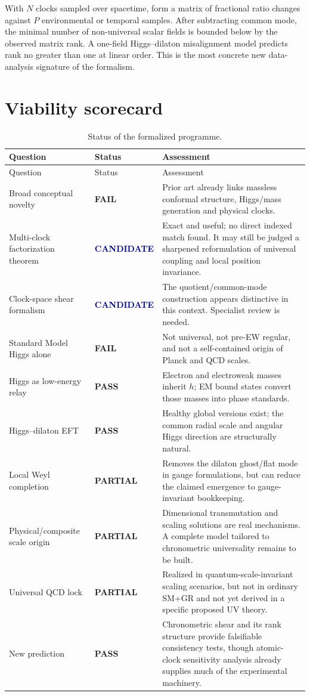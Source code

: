 \documentclass[11pt,a4paper]{article}
\newcommand{\Pass}{\textcolor{deepgreen}{\textbf{PASS}}}
\newcommand{\Fail}{\textcolor{deepred}{\textbf{FAIL}}}
\newcommand{\Partial}{\textcolor{deepamber}{\textbf{PARTIAL}}}
\newcommand{\Candidate}{\textcolor{navy}{\textbf{\scriptsize CANDIDATE}}}
\begin{document}
With $N$ clocks sampled over spacetime, form a matrix of fractional ratio changes against $P$ environmental or temporal samples. After subtracting common mode, the minimal number of non-universal scalar fields is bounded below by the observed matrix rank. A one-field Higgs--dilaton misalignment model predicts rank no greater than one at linear order. This is the most concrete new data-analysis signature of the formalism.

\section{Viability scorecard}

\small\begin{longtable}{@{}p{}p{}p{}@{}}
\caption{Status of the formalized programme.}\label{tab:scorecard}\\
\toprule
Question & Status & Assessment \\
\midrule
\endfirsthead
\toprule
Question & Status & Assessment \\
\midrule
\endhead
Broad conceptual novelty & \Fail & Prior art already links massless conformal structure, Higgs/mass generation and physical clocks. \\
Multi-clock factorization theorem & \Candidate & Exact and useful; no direct indexed match found. It may still be judged a sharpened reformulation of universal coupling and local position invariance. \\
Clock-space shear formalism & \Candidate & The quotient/common-mode construction appears distinctive in this context. Specialist review is needed. \\
Standard Model Higgs alone & \Fail & Not universal, not pre-EW regular, and not a self-contained origin of Planck and QCD scales. \\
Higgs as low-energy relay & \Pass & Electron and electroweak masses inherit $h$; EM bound states convert those masses into phase standards. \\
Higgs--dilaton EFT & \Pass & Healthy global versions exist; the common radial scale and angular Higgs direction are structurally natural. \\
Local Weyl completion & \Partial & Removes the dilaton ghost/flat mode in gauge formulations, but can reduce the claimed emergence to gauge-invariant bookkeeping. \\
Physical/composite scale origin & \Partial & Dimensional transmutation and scaling solutions are real mechanisms. A complete model tailored to chronometric universality remains to be built. \\
Universal QCD lock & \Partial & Realized in quantum-scale-invariant scaling scenarios, but not in ordinary SM+GR and not yet derived in a specific proposed UV theory. \\
New prediction & \Pass & Chronometric shear and its rank structure provide falsifiable consistency tests, though atomic-clock sensitivity analysis already supplies much of the experimental machinery. \\
\bottomrule
\end{longtable}
\end{document}
